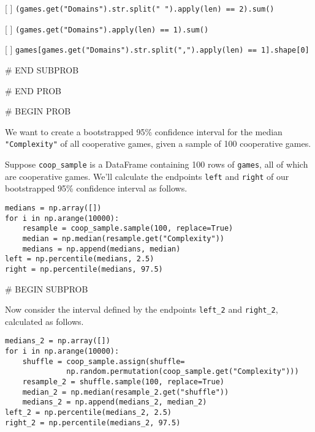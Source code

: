 \documentclass[twoside,12pt]{article}
\begin{document}
        \vspace{0.1in}

        [ ] \texttt{(games.get("Domains").str.split(" ").apply(len) == 2).sum()}

        [ ] \texttt{(games.get("Domains").apply(len) == 1).sum()}


        [ ] \texttt{games[games.get("Domains").str.split(",").apply(len) == 1].shape[0]}
    

# END SUBPROB




# END PROB

\newpage
# BEGIN PROB



We want to create a bootstrapped 95\% confidence interval for the median \texttt{"Complexity"} of all cooperative games, given a sample of 100 cooperative games. 

Suppose \texttt{coop\_sample} is a DataFrame containing 100 rows of \texttt{games}, all of which are cooperative games. We'll calculate the endpoints \texttt{left} and \texttt{right} of our bootstrapped 95\% confidence interval as follows.

\begin{verbatim}
medians = np.array([])
for i in np.arange(10000):
    resample = coop_sample.sample(100, replace=True)
    median = np.median(resample.get("Complexity"))
    medians = np.append(medians, median)
left = np.percentile(medians, 2.5)
right = np.percentile(medians, 97.5)
\end{verbatim}


    # BEGIN SUBPROB


        Now consider the interval defined by the endpoints \texttt{left\_2} and \texttt{right\_2}, calculated as follows. 

\begin{verbatim}
medians_2 = np.array([])
for i in np.arange(10000):
    shuffle = coop_sample.assign(shuffle=
              np.random.permutation(coop_sample.get("Complexity")))
    resample_2 = shuffle.sample(100, replace=True)
    median_2 = np.median(resample_2.get("shuffle"))
    medians_2 = np.append(medians_2, median_2)
left_2 = np.percentile(medians_2, 2.5)
right_2 = np.percentile(medians_2, 97.5)
\end{verbatim}
\end{document}
